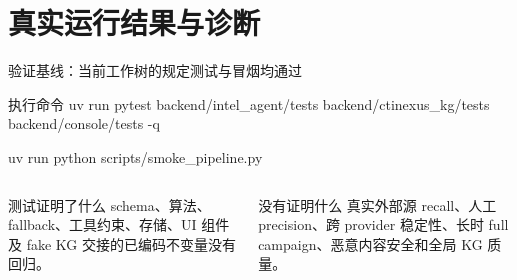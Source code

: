 \section{真实运行结果与诊断}

\begin{frame}{验证基线：当前工作树的规定测试与冒烟均通过}
\centering
{}\hfill
{}\hfill
{}\hfill
{}

\vspace{1.2em}
\begin{block}{执行命令}
\small\ttfamily
uv run pytest backend/intel\_agent/tests backend/ctinexus\_kg/tests backend/console/tests -q

uv run python scripts/smoke\_pipeline.py
\end{block}

\begin{columns}[T,onlytextwidth]
\begin{exampleblock}{测试证明了什么}
schema、算法、fallback、工具约束、存储、UI 组件及 fake KG 交接的已编码不变量没有回归。
\end{exampleblock}
\begin{alertblock}{没有证明什么}
真实外部源 recall、人工 precision、跨 provider 稳定性、长时 full campaign、恶意内容安全和全局 KG 质量。
\end{alertblock}
\end{columns}
\end{frame}

